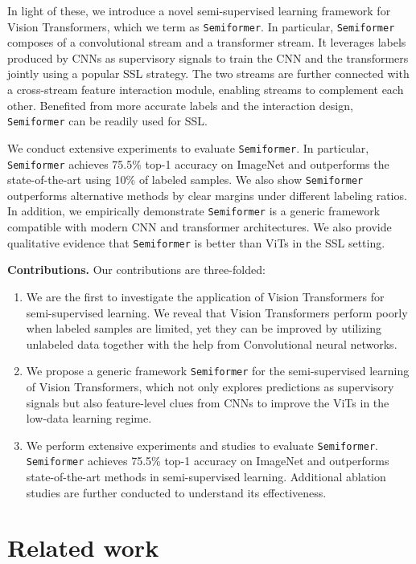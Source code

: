 \documentclass[runningheads]{llncs}
\makeatletter
\newcommand*{\system}{\texttt{Semiformer}\@\xspace}
\makeatother
\begin{document}
In light of these, we introduce a novel semi-supervised learning framework for Vision Transformers, which we term as {\system}. In particular, \system composes of a convolutional stream and a transformer stream. It leverages labels produced by CNNs as supervisory signals to train the CNN and the transformers jointly using a popular SSL strategy. The two streams are further connected with a cross-stream feature interaction module, enabling streams to complement each other.  Benefited from more accurate labels and the interaction design, \system can be readily used for SSL. 

We conduct extensive experiments to evaluate \system.  In particular, \system achieves 75.5\% top-1 accuracy on ImageNet and outperforms the state-of-the-art using 10\% of labeled samples. We also show \system outperforms alternative methods by clear margins under different labeling ratios. In addition, we empirically demonstrate \system is a generic framework compatible with modern CNN and transformer architectures. We also provide qualitative evidence that \system is better than ViTs in the SSL setting. \newline


\textbf{Contributions. } Our contributions are three-folded:
\begin{enumerate}
\itemsep 3pt
    \item We are the first to investigate the application of Vision Transformers for semi-supervised learning. We reveal that Vision Transformers perform poorly when labeled samples are limited, yet they can be improved by utilizing unlabeled data together with the help from Convolutional neural networks. 
    \item We propose a generic framework \system for the semi-supervised learning of Vision Transformers, which not only explores predictions as supervisory signals but also feature-level clues from CNNs to improve the ViTs in the low-data learning regime.
    \item We perform extensive experiments and studies to evaluate \system.  \system achieves 75.5\% top-1 accuracy on ImageNet and outperforms state-of-the-art methods in semi-supervised learning. Additional ablation studies are further conducted to understand its effectiveness. 
\end{enumerate}

\section{Related work}
\end{document}
